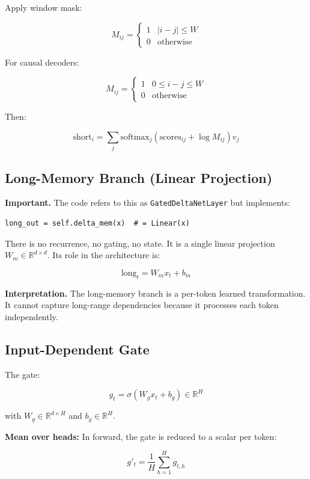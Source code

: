 Apply window mask:

\[
M_{ij} = \begin{cases} 1 & |i - j| \leq W \\ 0 & \text{otherwise} \end{cases}
\tag{4.2}
\]

For causal decoders:

\[
M_{ij} = \begin{cases} 1 & 0 \leq i - j \leq W \\ 0 & \text{otherwise} \end{cases}
\tag{4.3}
\]

Then:

\[
\text{short}_i = \sum_j \text{softmax}_j(\text{scores}_{ij} + \log M_{ij}) v_j
\tag{4.4}
\]

\subsection{Long-Memory Branch (Linear Projection)}

\textbf{Important.} The code refers to this as \texttt{GatedDeltaNetLayer} but 
implements:

\begin{lstlisting}
long_out = self.delta_mem(x)  # = Linear(x)
\end{lstlisting}

There is no recurrence, no gating, no state. It is a single linear 
projection $W_m \in \mathbb{R}^{d \times d}$. Its role in the architecture 
is:

\[
\text{long}_t = W_m x_t + b_m
\tag{4.5}
\]

\textbf{Interpretation.} The long-memory branch is a per-token learned 
transformation. It cannot capture long-range dependencies because it 
processes each token independently.

\subsection{Input-Dependent Gate}

The gate:

\[
g_t = \sigma(W_g x_t + b_g) \in \mathbb{R}^H
\tag{4.6}
\]

with $W_g \in \mathbb{R}^{d \times H}$ and $b_g \in \mathbb{R}^H$.

\textbf{Mean over heads:} In forward, the gate is reduced to a scalar per token:

\[
g'_t = \frac{1}{H} \sum_{h=1}^H g_{t,h}
\tag{4.7}
\]

